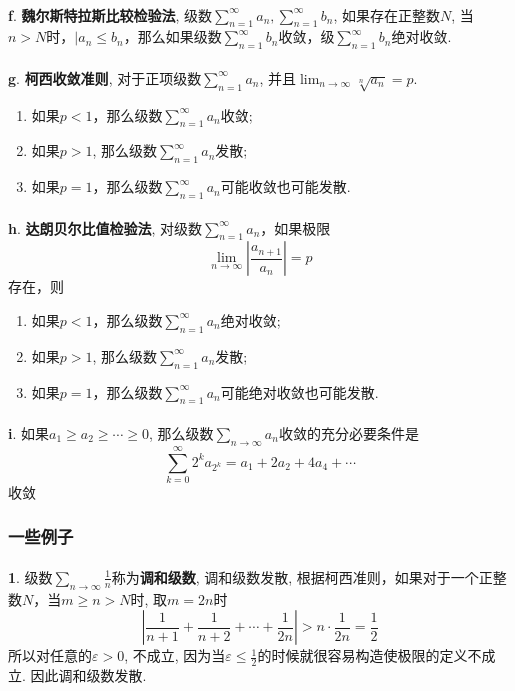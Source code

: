 \paragraph{}
\textbf{f}. \textbf{魏尔斯特拉斯比较检验法}, 级数$\sum_{n=1}^\infty a_n, \sum_{n=1}^\infty b_n$, 如果存在正整数$N$, 当$n > N$时，$|a_n \leq b_n$，那么如果级数$\sum_{n=1}^\infty b_n$收敛，级$\sum_{n=1}^\infty b_n$绝对收敛.

\paragraph{}
\textbf{g}. \textbf{柯西收敛准则}, 对于正项级数$\sum_{n=1}^\infty a_n$, 并且$\lim_{n\to \infty} \sqrt[n]{a_n} = p$. 
\begin{enumerate}
\item 如果$p < 1$，那么级数$\sum_{n=1}^\infty a_n$收敛;
\item 如果$p > 1$,  那么级数$\sum_{n=1}^\infty a_n$发散;
\item 如果$p = 1$，那么级数$\sum_{n=1}^\infty a_n$可能收敛也可能发散.
\end{enumerate}

\paragraph{}
\textbf{h}. \textbf{达朗贝尔比值检验法}, 对级数$\sum_{n=1}^\infty a_n$，如果极限
$$
\lim_{n\to \infty}|\frac{a_{n+1}}{a_n}| = p
$$
存在，则
\begin{enumerate}
\item 如果$p < 1$，那么级数$\sum_{n=1}^\infty a_n$绝对收敛;
\item 如果$p > 1$,  那么级数$\sum_{n=1}^\infty a_n$发散;
\item 如果$p = 1$，那么级数$\sum_{n=1}^\infty a_n$可能绝对收敛也可能发散.
\end{enumerate}

\paragraph{}
\textbf{i}. 如果$a_1 \geq a_2 \geq \cdots \geq 0$, 那么级数$\sum_{n\to \infty}a_n$收敛的充分必要条件是
$$
\sum_{k=0}^\infty 2^k a_{2^k} = a_1 + 2a_2 + 4a_4 + \cdots 
$$
收敛


\subsubsection{一些例子}
\paragraph{}
\textbf{1}. 级数$\sum_{n\to \infty} \frac{1}{n}$称为\textbf{调和级数}, 调和级数发散, 根据柯西准则，如果对于一个正整数$N$，当$m \geq n > N$时, 取$m = 2n$时
$$
|\frac{1}{n+1} + \frac{1}{n+2} + \cdots + \frac{1}{2n}| > n \cdot \frac{1}{2n} = \frac{1}{2}
$$
所以对任意的$\varepsilon > 0$, 不成立, 因为当$\varepsilon \leq \frac{1}{2}$的时候就很容易构造使极限的定义不成立. 因此调和级数发散.

